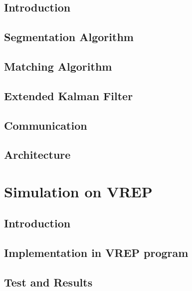 \documentclass{book} %
\begin{document}
\section{Introduction}


\section{Segmentation Algorithm}


\section{Matching Algorithm}


\section{Extended Kalman Filter}


\section{Communication}


\section{Architecture}



\chapter{Simulation on VREP}
\section{Introduction}


\section{Implementation in VREP program}


\section{Test and Results}

\end{document}
